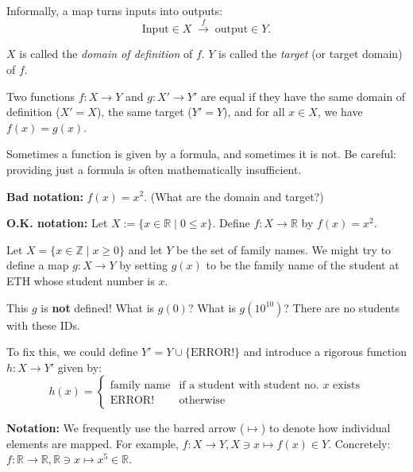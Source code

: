 Informally, a map turns inputs into outputs:
\[
\text{Input} \in X \; \xrightarrow{\ f\ } \; \text{output} \in Y .
\]

$X$ is called the \textit{domain of definition} of $f$. 
$Y$ is called the \textit{target} (or target domain) of $f$.

\begin{definition}
\label{def:equality_of_functions}
Two functions $f: X \to Y$ and $g: X' \to Y'$ are equal if they have the same domain of definition ($X' = X$), the same target ($Y' = Y$), and for all $x \in X$, we have $f(x) = g(x)$.
\end{definition}

Sometimes a function is given by a formula, and sometimes it is not. Be careful: providing just a formula is often mathematically insufficient.

\begin{example}
\textbf{Bad notation:} $f(x) = x^2$. (What are the domain and target?)

\textbf{O.K. notation:} Let $X := \{x \in \mathbb{R} \mid 0 \le x\}$. Define $f: X \to \mathbb{R}$ by $f(x) = x^2$.
\end{example}

\begin{example}
Let $X = \{x \in \mathbb{Z} \mid x \ge 0\}$ and let $Y$ be the set of family names. We might try to define a map $g: X \to Y$ by setting $g(x)$ to be the family name of the student at ETH whose student number is $x$.

This $g$ is \textbf{not} defined! What is $g(0)$? What is $g(10^{10})$? There are no students with these IDs. 

To fix this, we could define $Y' = Y \cup \{\text{ERROR!}\}$ and introduce a rigorous function $h: X \to Y'$ given by:
\[
h(x) = 
\begin{cases} 
\text{family name} & \text{if a student with student no. } x \text{ exists} \\
\text{ERROR!} & \text{otherwise}
\end{cases}
\]
\end{example}

\begin{remark}
\textbf{Notation:} We frequently use the barred arrow ($\mapsto$) to denote how individual elements are mapped. For example, $f: X \to Y, X \ni x \mapsto f(x) \in Y$. 
Concretely: $f: \mathbb{R} \to \mathbb{R}, \mathbb{R} \ni x \mapsto x^5 \in \mathbb{R}$.
\end{remark}

